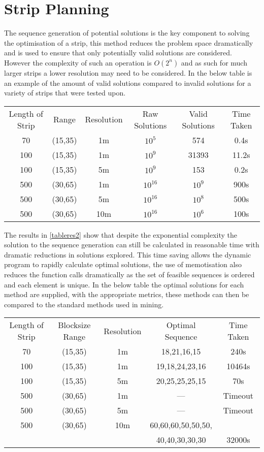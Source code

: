 \section{Strip Planning}
The sequence generation of potential solutions is the key component to solving the optimisation of a strip, this method reduces the problem space dramatically and is used to ensure that only potentially valid solutions are considered. However the complexity of such an operation is $O(2^n)$ and as such for much larger strips a lower resolution may need to be considered. In the below table is an example of the amount of valid solutions compared to invalid solutions for a variety of strips that were tested upon.
\begin{center}
\label{tableres2}
 \begin{tabular}{|c| c| c|c|c|c|} 
 \hline
 Length of Strip &  Range & Resolution & Raw Solutions & Valid Solutions & Time Taken\\ 
 70 & (15,35) & 1m & $10^5$ & 574 & 0.4s\\ 
 \hline
 100 & (15,35) & 1m & $10^9$ & 31393 & 11.2s\\
 \hline
 100 & (15,35)& 5m & $10^9$ & 153 & 0.2s\\
 \hline
 500 & (30,65)& 1m & $10^16$ & $10^9$ & 900s\\
 \hline
 500 & (30,65) & 5m & $10^16$ &$10^8$ & 500s \\ 
 \hline
 500 & (30,65) & 10m & $10^16$& $10^6$ & 100s\\ 
 \hline
\end{tabular}
\end{center}
 The results in \ref{tableres2} show that despite the exponential complexity the solution to the sequence generation can still be calculated in reasonable time with dramatic reductions in solutions explored. This time saving allows the dynamic program to rapidly calculate optimal solutions, the use of memotisation also reduces the function calls dramatically as the set of feasible sequences is ordered and each element is unique. In the below table the optimal solutions for each method are supplied, with the appropriate metrics, these methods can then be compared to the standard methods used in mining.
 \begin{center} 
  \begin{tabular}{|c| c| c|c|c|} 
 \hline
 Length of Strip & Blocksize Range & Resolution & Optimal Sequence & Time Taken\\ 
 70 & (15,35) & 1m  & 18,21,16,15 & 240s\\ 
 \hline
 100 & (15,35) & 1m  & 19,18,24,23,16 & 10464s\\
 \hline
 100 & (15,35)& 5m  & 20,25,25,25,15 & 70s\\
 \hline
 500 & (30,65)& 1m & ---& Timeout\\
 \hline
 500 & (30,65) & 5m  &--- & Timeout \\ 
 \hline
 500 & (30,65) & 10m &  60,60,60,50,50,50,& \\
 & & & 40,40,30,30,30 & 32000s\\ 
 \hline
\end{tabular}
\end{center}
